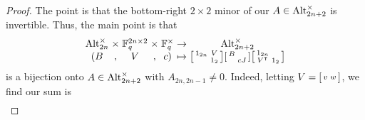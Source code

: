 \begin{proof}
    The point is that the bottom-right $2\times2$ minor of our $A\in\operatorname{Alt}_{2n+2}^\times$ is invertible. Thus, the main point is that
    \[\arraycolsep=1.4pt\begin{array}{ccccccccccc}
        \Alt_{2n}^\times &\times& \FF_q^{2n\times2} &\times& \FF_q^\times &\to& \Alt_{2n+2}^\times \\
        (B &,& V &,& c) &\mapsto& \begin{bsmallmatrix}
            1_{2n} & V \\ & 1_2
        \end{bsmallmatrix}\begin{bsmallmatrix}
            B \\ & cJ
        \end{bsmallmatrix}\begin{bsmallmatrix}
            1_{2n} \\ V^\intercal & 1_2
        \end{bsmallmatrix}
    \end{array}\]
    is a bijection onto $A\in\operatorname{Alt}_{2n+2}^\times$ with $A_{2n,2n-1}\ne0$. Indeed, letting $V=\begin{bsmallmatrix}
        v & w
    \end{bsmallmatrix}$, we find our sum is
    \begin{align*}

\end{align*}
\end{proof}
